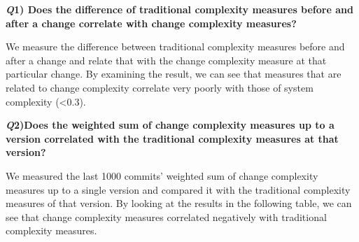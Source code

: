 \documentclass[9pt,twocolumn,a4paper]{article}
\begin{document}
{\bf{\emph Q1) Does the difference of traditional complexity measures before and after a change correlate with change complexity measures?}}
\newline

We measure the difference between traditional complexity measures before and after a change and relate that with the change complexity measure at that particular change. By examining the result, we can see that measures that are related to change complexity correlate very poorly with those of system complexity (\textless 0.3).
\newline

\begin{table}[ht]

\centering
{}
\caption {\small Correlation Matrix of Research Question 1.}
\label{tab:table1} 

\end{table}

{\bf{\emph Q2)Does the weighted sum of change complexity measures up to a version correlated with the traditional complexity measures at that version? }}
\newline

We measured the last 1000 commits' weighted sum of change complexity measures up to a single version and compared it with the traditional complexity measures of that version. By looking at the results in the following table, we can see that change complexity measures correlated negatively with traditional complexity measures.
\newline
\end{document}
